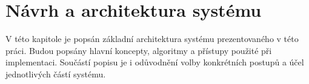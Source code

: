 \clearpage
\section{Návrh a architektura systému}\label{sec:navrh_architektura}
V této kapitole je popsán základní architektura systému prezentovaného v této práci.
Budou popsány hlavní koncepty, algoritmy a přístupy použité při implementaci.
Součástí popisu je i odůvodnění volby konkrétních postupů a účel jednotlivých částí systému.




